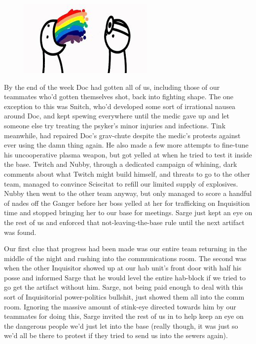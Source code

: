 \begin{figure}
	\begin{center}
		\includegraphics[width=\figwidth]{pics/18/45.png}
	\end{center}
\end{figure}
By the end of the week Doc had gotten all of us, including those of our teammates who'd gotten themselves shot, back into fighting shape. 
The one exception to this was Snitch, who'd developed some sort of irrational nausea around Doc, and kept spewing everywhere until the medic gave up and let someone else try treating the psyker's minor injuries and infections. 
Tink meanwhile, had repaired Doc's grav-chute despite the medic's protests against ever using the damn thing again. 
He also made a few more attempts to fine-tune his uncooperative plasma weapon, but got yelled at when he tried to test it inside the base. 
Twitch and Nubby, through a dedicated campaign of whining, dark comments about what Twitch might build himself, and threats to go to the other team, managed to convince Sciscitat to refill our limited supply of explosives. 
Nubby then went to the other team anyway, but only managed to score a handful of nades off the Ganger before her boss yelled at her for trafficking on Inquisition time and stopped bringing her to our base for meetings. 
Sarge just kept an eye on the rest of us and enforced that not-leaving-the-base rule until the next artifact was found.

Our first clue that progress had been made was our entire team returning in the middle of the night and rushing into the communications room. 
The second was when the other Inquisitor showed up at our hab unit's front door with half his posse and informed Sarge that he would level the entire hab-block if we tried to go get the artifact without him. 
Sarge, not being paid enough to deal with this sort of Inquisitorial power-politics bullshit, just showed them all into the comm room. 
Ignoring the massive amount of stink-eye directed towards him by our teammates for doing this, Sarge invited the rest of us in to help keep an eye on the dangerous people we'd just let into the base (really though, it was just so we'd all be there to protest if they tried to send us into the sewers again).

